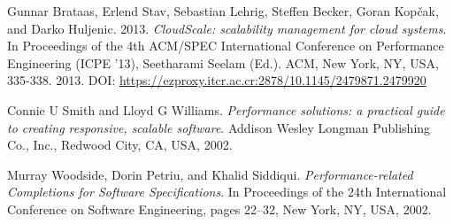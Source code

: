 \documentclass[11pt, twoside]{report}
\begin{document}
\begin{thebibliography}{9}
 Gunnar Brataas, Erlend Stav, Sebastian Lehrig, Steffen Becker, Goran Kopčak, and Darko Huljenic. 2013. \emph{CloudScale: scalability management for cloud systems}. In Proceedings of the 4th ACM/SPEC International Conference on Performance Engineering (ICPE '13), Seetharami Seelam (Ed.). ACM, New York, NY, USA, 335-338. 2013. DOI: \url{https://ezproxy.itcr.ac.cr:2878/10.1145/2479871.2479920}

 Connie U Smith and Lloyd G Williams. \emph{Performance solutions: a practical guide to creating responsive, scalable software}. Addison Wesley Longman Publishing Co., Inc., Redwood City, CA, USA, 2002.

 Murray Woodside, Dorin Petriu, and Khalid Siddiqui. \emph{Performance-related Completions for Software Specifications}. In Proceedings of the 24th International Conference on Software Engineering, pages 22–32, New York, NY, USA, 2002.

\end{thebibliography}
\end{document}
